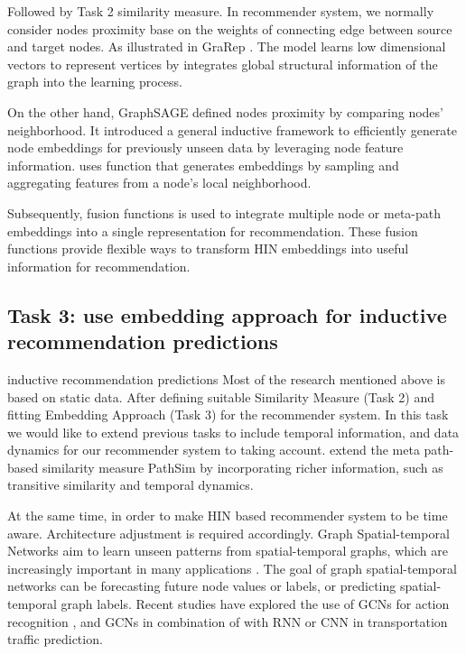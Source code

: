 Followed by Task 2 similarity measure. In recommender system, we normally consider nodes proximity base on the weights of connecting edge between source and target nodes. As illustrated in GraRep \citep{cao2015grarep}. The model learns low dimensional vectors to represent vertices by integrates global structural information of the graph into the learning process.

On the other hand, GraphSAGE defined nodes proximity by comparing nodes' neighborhood. It introduced a general inductive framework to efficiently generate node embeddings for previously unseen data by leveraging node feature information. \citet{hamilton2017inductive} uses function that generates embeddings by sampling and aggregating features from a node’s local neighborhood.

Subsequently, fusion functions is used to integrate multiple node or meta-path embeddings into a single representation for recommendation. These fusion functions provide flexible ways to transform HIN embeddings into useful information for recommendation.



\subsection{Task 3: use embedding approach for inductive recommendation predictions}

inductive recommendation predictions
Most of the research mentioned above is based on static data. After defining suitable Similarity Measure (Task 2) and fitting Embedding Approach (Task 3) for the recommender system. In this task we would like to extend previous tasks to include temporal information, and data dynamics for our recommender system to taking account. \citet{he2014exploiting} extend the meta
path-based similarity measure PathSim by incorporating richer information, such as
transitive similarity and temporal dynamics. 

At the same time, in order to make HIN based recommender system to be time aware. Architecture adjustment is required accordingly. Graph Spatial-temporal Networks aim to learn unseen patterns from spatial-temporal graphs, which are increasingly important in many applications \citep{wu2019comprehensive}. 
The goal of graph spatial-temporal networks can be forecasting future node values or labels, or predicting spatial-temporal graph labels. Recent studies have explored the use of GCNs for action recognition \citep{yan2018spatial}, and GCNs in combination of with RNN \citep{li2017diffusion} or CNN \citep{yu2017spatio} in transportation traffic prediction.

